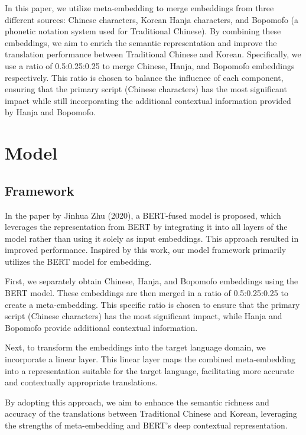 \documentclass[PhD]{PHlab-thesis}
\begin{document}
In this paper, we utilize meta-embedding to merge embeddings from three different sources: Chinese characters, Korean Hanja characters, and Bopomofo (a phonetic notation system used for Traditional Chinese). By combining these embeddings, we aim to enrich the semantic representation and improve the translation performance between Traditional Chinese and Korean. Specifically, we use a ratio of 0.5:0.25:0.25 to merge Chinese, Hanja, and Bopomofo embeddings respectively. This ratio is chosen to balance the influence of each component, ensuring that the primary script (Chinese characters) has the most significant impact while still incorporating the additional contextual information provided by Hanja and Bopomofo.

\section{Model}

\subsection{Framework}
In the paper by Jinhua Zhu (2020)\cite{zhu2020incorporating}, a BERT-fused model is proposed, which leverages the representation from BERT by integrating it into all layers of the model rather than using it solely as input embeddings. This approach resulted in improved performance. Inspired by this work, our model framework primarily utilizes the BERT model for embedding.

First, we separately obtain Chinese, Hanja, and Bopomofo embeddings using the BERT model. These embeddings are then merged in a ratio of 0.5:0.25:0.25 to create a meta-embedding. This specific ratio is chosen to ensure that the primary script (Chinese characters) has the most significant impact, while Hanja and Bopomofo provide additional contextual information.

Next, to transform the embeddings into the target language domain, we incorporate a linear layer. This linear layer maps the combined meta-embedding into a representation suitable for the target language, facilitating more accurate and contextually appropriate translations.

By adopting this approach, we aim to enhance the semantic richness and accuracy of the translations between Traditional Chinese and Korean, leveraging the strengths of meta-embedding and BERT's deep contextual representation.
\end{document}
